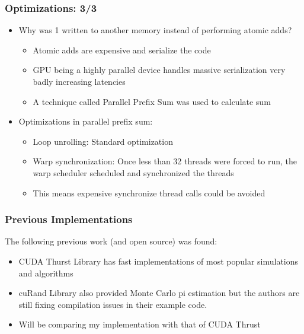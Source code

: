 \documentclass[mathserif]{beamer}
\begin{document}
\begin{frame}                                                                                                                                                                          
\frametitle{Optimizations: 3/3}
\begin{itemize}
\item Why was 1 written to another memory instead of performing atomic adds? 
\begin{itemize}
\item Atomic adds are expensive and serialize the code 
\item GPU being a highly parallel device handles massive serialization very badly increasing latencies 
\item A technique called Parallel Prefix Sum was used to calculate sum
\end{itemize}
\item Optimizations in parallel prefix sum:  
\begin{itemize}
\item Loop unrolling: Standard optimization 
\item Warp synchronization: Once less than 32 threads were forced to run, the warp scheduler scheduled and synchronized the threads 
\item This means expensive synchronize thread calls could be avoided
\end{itemize}
\end{itemize}
\end{frame}              

\begin{frame}                                                                                                                                                                          
\frametitle{Previous Implementations}
The following previous work (and open source) was found:
\begin{itemize}
\item CUDA Thurst Library has fast implementations of most popular simulations and algorithms 
\item cuRand Library also provided Monte Carlo pi estimation but the authors are still fixing compilation issues in their example code. 
\item Will be comparing my implementation with that of CUDA Thrust 
\end{itemize}
\end{frame}             
\end{document}
